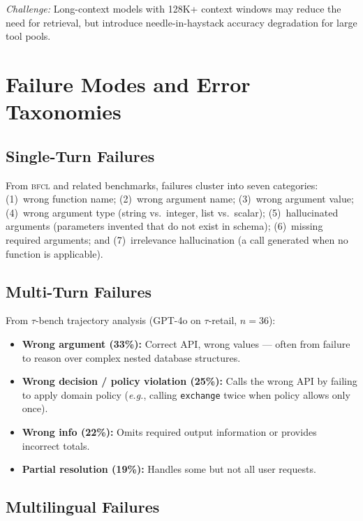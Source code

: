 \documentclass[11pt]{article}
\newcommand{\taubench}{$\tau$-bench}
\newcommand{\bfcl}{\textsc{bfcl}}
\newcommand{\eg}{\textit{e.g.},\xspace}
\begin{document}
\emph{Challenge:} Long-context models with 128K+ context windows may reduce the need for retrieval,
but introduce needle-in-haystack accuracy degradation for large tool pools.

\section{Failure Modes and Error Taxonomies}
\label{sec:failures}

\subsection{Single-Turn Failures}

From \bfcl{} and related benchmarks, failures cluster into seven categories:
(1)~wrong function name; (2)~wrong argument name; (3)~wrong argument value;
(4)~wrong argument type (string vs.\ integer, list vs.\ scalar); (5)~hallucinated arguments
(parameters invented that do not exist in schema); (6)~missing required arguments; and
(7)~irrelevance hallucination (a call generated when no function is applicable).

\subsection{Multi-Turn Failures}

From \taubench{} trajectory analysis (GPT-4o on $\tau$-retail, $n=36$):
\begin{itemize}[leftmargin=1.2em, itemsep=2pt]
  \item \textbf{Wrong argument (33\%):} Correct API, wrong values --- often from failure to reason
        over complex nested database structures.
  \item \textbf{Wrong decision / policy violation (25\%):} Calls the wrong API by failing to apply
        domain policy (\eg calling \texttt{exchange} twice when policy allows only once).
  \item \textbf{Wrong info (22\%):} Omits required output information or provides incorrect totals.
  \item \textbf{Partial resolution (19\%):} Handles some but not all user requests.
\end{itemize}

\subsection{Multilingual Failures}
\end{document}
